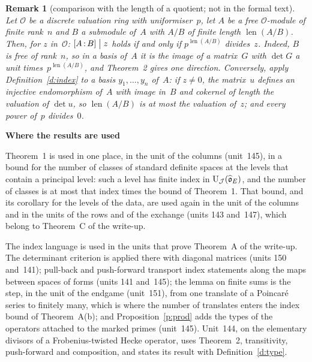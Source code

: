 \documentclass[11pt,a4paper]{article}
\newcommand{\len}{\operatorname{len}}
\newcommand{\m}[1]{\mbox{$#1$}}        %
\newcommand{\sect}[2]{\refstepcounter{section}\label{#2}\par\addvspace{19pt plus 4pt minus 2pt}\Needspace{7\baselineskip}%
  \noindent\llap{{\fontsize{13.2}{16}\selectfont\bfseries\color{inkfaint}\thesection}\hspace{9pt}}%
  {\fontsize{13.2}{16}\selectfont\bfseries\color{ink}#1}\par\nopagebreak\vspace{-1pt}}
\theoremstyle{plainx}
\theoremstyle{uprightx}
\newtheorem{remark}[theorem]{Remark}
\newcommand{\cO}{\mathcal{O}}
\newcommand{\cJ}{\mathcal{J}}
\begin{document}
\begin{remark}[comparison with the length of a quotient; not in the formal text]\label{r:dvr}
Let $\cO$ be a discrete valuation ring with uniformiser~$p$, let $A$ be a free $\cO$-module of finite rank~$n$ and
$B$ a submodule of~$A$ with \m{A/B} of finite length \m{\len(A/B)}. Then, for $z$ in~$\cO$:
\m{\IndexDvd{A}{B}{z}} holds if and only if \m{p^{\len(A/B)}} divides~$z$. Indeed, $B$ is free of rank~$n$, so in a
basis of~$A$ it is the image of a matrix~$G$ with \m{\det G} a unit times~\m{p^{\len(A/B)}}, and Theorem~2 gives one
direction. Conversely, apply Definition~\ref{d:index} to a basis \m{y_1,\dots,y_n} of~$A$: if \m{z\ne0}, the
matrix~$u$ defines an injective endomorphism of~$A$ with image in~$B$ and cokernel of length the valuation of
\m{\det u}, so \m{\len(A/B)} is at most the valuation of~$z$; and every power of~$p$ divides~$0$.
\end{remark}

\sect{Where the results are used}{s:use}
Theorem~1 is used in one place, in the unit of the columns (unit~145), in a bound for the number of classes of
standard definite spaces at the levels that contain a principal level: such a level has finite index in
\m{\Kf{E}{\cJ}}, and the number of classes is at most that index times the bound of Theorem~1. That bound, and
its corollary for the levels of the data, are used again in the unit of the columns and in the units of the rows
and of the exchange (units 143 and~147), which belong to Theorem~C of the write-up.

The index language is used in the units that prove Theorem~A of the write-up. The determinant criterion is
applied there with diagonal matrices (units 150 and~141); pull-back and push-forward transport index statements
along the maps between spaces of forms (units 141 and~145); the lemma on finite sums is the step, in the unit
of the endgame (unit~151), from one translate of a Poincar\'e series to finitely many, which is where the
number of translates enters the index bound of Theorem~A(b); and Proposition~\ref{p:prod} adds the types of the
operators attached to the marked primes (unit~145). Unit~144, on the elementary divisors of a Frobenius-twisted
Hecke operator, uses Theorem~2, transitivity, push-forward and composition, and states its result with
Definition~\ref{d:type}.
\end{document}
